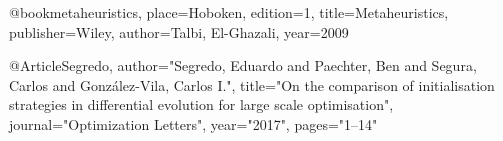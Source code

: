 @book{metaheuristics,
place={Hoboken},
edition={1},
title={Metaheuristics},
publisher={Wiley},
author={Talbi, El-Ghazali},
year={2009}
}

@Article{Segredo,
author="Segredo, Eduardo
and Paechter, Ben
and Segura, Carlos
and Gonz{\'a}lez-Vila, Carlos I.",
title="On the comparison of initialisation strategies in differential evolution for large scale optimisation",
journal="Optimization Letters",
year="2017",
pages="1--14"
}

